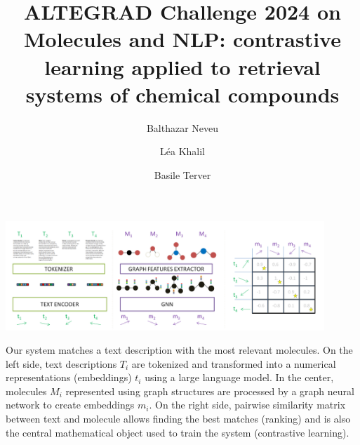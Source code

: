 \documentclass[sigconf, nonacm]{acmart}
\title{ALTEGRAD Challenge 2024 on Molecules and NLP: contrastive learning applied to retrieval systems of chemical compounds}
\author{Balthazar Neveu}
\affiliation{%
  \institution{ENS Paris-Saclay}
  \city{Saclay}
  \country{France}
}
\author{Léa Khalil}
\affiliation{%
  \institution{Ecole Polytechnique}
  \city{Palaiseau}
  \country{France}
}
\author{Basile Terver}
\affiliation{%
  \institution{Ecole Polytechnique}
  \city{Palaiseau}
  \country{France}
}
\begin{document}

  \begin{teaserfigure}
    \includegraphics[width=0.9\textwidth]{figures/mol_text_overview.PNG}
    \centering
    \caption{Our system matches a text description with the most relevant molecules. On the left side, text descriptions $T_{i}$ are tokenized and transformed into a numerical representations (embeddings) $t_{i}$ using a large language model. In the center, molecules $M_{i}$ represented using graph structures are processed by a graph neural network to create embeddings $m_{i}$. On the right side, pairwise similarity matrix between text and molecule allows finding the best matches (ranking) and is also the central mathematical object used to train the system (contrastive learning).
    }
    \label{fig:original_pipeline}
\end{teaserfigure}

  \maketitle



  
  
  
  
  

  \newpage

  \appendix
  
  
  \newpage
  
  
\end{document}
